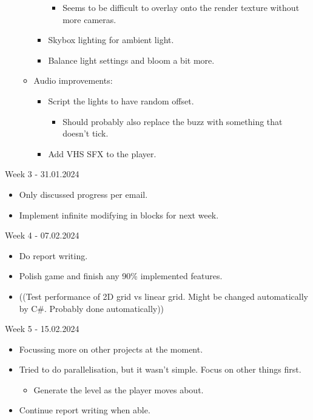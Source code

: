\begin{itemize}
\begin{itemize}
\begin{itemize}
            \begin{itemize}
                \item Seems to be difficult to overlay onto the render texture without more cameras.
            \end{itemize}
            \item Skybox lighting for ambient light.
            \item Balance light settings and bloom a bit more.
        \end{itemize}
        \item Audio improvements:
        \begin{itemize}
            \item Script the lights to have random offset.
            \begin{itemize}
                \item Should probably also replace the buzz with something that doesn’t tick.
            \end{itemize}
            \item Add VHS SFX to the player.
        \end{itemize}
    \end{itemize}
\end{itemize}

\noindent Week 3 - 31.01.2024
\begin{itemize}
    \item Only discussed progress per email.
    \item Implement infinite modifying in blocks for next week.
\end{itemize}

\noindent Week 4 - 07.02.2024
\begin{itemize}
    \item Do report writing.
    \item Polish game and finish any 90\% implemented features.
    \item ((Test performance of 2D grid vs linear grid. Might be changed automatically by C\#. Probably done automatically))
\end{itemize}

\noindent Week 5 - 15.02.2024
\begin{itemize}
    \item Focussing more on other projects at the moment.
    \item Tried to do parallelisation, but it wasn’t simple. Focus on other things first.
    \begin{itemize}
        \item Generate the level as the player moves about.
    \end{itemize}
    \item Continue report writing when able.
\end{itemize}

